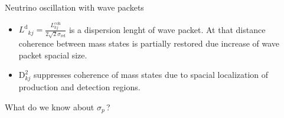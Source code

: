 \documentclass[usenames, dvipsnames]{beamer}
\newcommand{\Ld}{\ensuremath{L^{\text{d}}}}
\newcommand{\Important}{\textcolor{BrickRed}}
\begin{document}
\begin{frame}[fragile]
\begin{columns}[T]
\begin{column}{.5\textwidth}
\begin{block}{Neutrino oscillation with wave packets}
\begin{itemize}
\begin{itemize}
        \item \Important{$\Ld_{kj}  =
            \frac{L^\text{coh}_{kj}}{2\sqrt{2}\sigma_{\text{rel}}}$} is a
            \Important{dispersion lenght} of wave packet. At that distance
             coherence between mass states is partially restored due increase of
             wave packet spacial size. 
         \item \Important{\ensuremath{\text{D}^2_{kj}}} suppresses coherence
             of mass states due to spacial localization of production and
             detection regions.
    \end{itemize}
  \end{itemize}
\end{block}


\begin{block}{What do we know about \ensuremath{\sigma_p\,}?}
\end{block}

\end{column}

\begin{column}{.5\textwidth}
\end{column}
\end{columns}

\end{frame}
\end{document}
